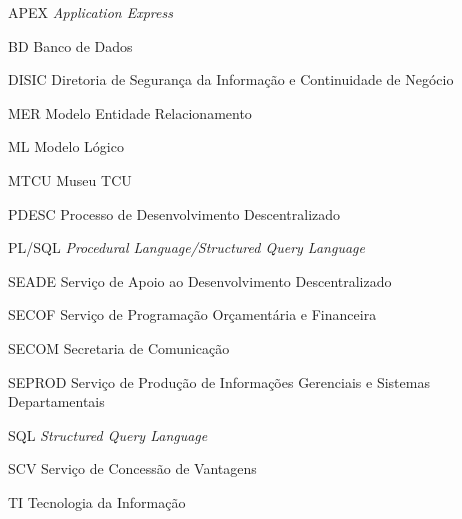 \begin{siglas}
  \item [APEX] \textit{Application Express}
  \item [BD] Banco de Dados
  \item [DISIC] Diretoria de Segurança da Informação e Continuidade de Negócio
  \item [MER] Modelo Entidade Relacionamento
  \item [ML] Modelo Lógico
  \item [MTCU] Museu TCU
  \item [PDESC] Processo de Desenvolvimento Descentralizado
  \item [PL/SQL] \textit{Procedural Language/Structured Query Language}
  \item [SEADE] Serviço de Apoio ao Desenvolvimento Descentralizado
  \item [SECOF] Serviço de Programação Orçamentária e Financeira
  \item [SECOM] Secretaria de Comunicação
  \item [SEPROD] Serviço de Produção de Informações Gerenciais e Sistemas Departamentais
  \item [SQL] \textit{Structured Query Language}
  \item [SCV] Serviço de Concessão de Vantagens
  \item [TI] Tecnologia da Informação
\end{siglas}
